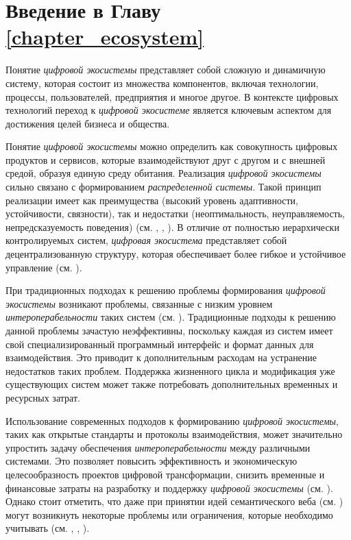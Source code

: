 \section*{Введение в Главу \ref{chapter_ecosystem}}

Понятие \textit{цифровой экосистемы} представляет собой сложную и динамичную систему, которая состоит из множества компонентов, включая технологии, процессы, пользователей, предприятия и многое другое. В контексте цифровых технологий переход к \textit{цифровой экосистеме} является ключевым аспектом для достижения целей бизнеса и общества.

Понятие \textit{цифровой экосистемы} можно определить как совокупность цифровых продуктов и сервисов, которые взаимодействуют друг с другом и с внешней средой, образуя единую среду обитания. Реализация \textit{цифровой экосистемы} сильно связано с формированием \textit{распределенной системы}. Такой принцип реализации имеет как преимущества (высокий уровень адаптивности, устойчивости, связности), так и недостатки (неоптимальность, неуправляемость, непредсказуемость поведения) (см. , , ). В отличие от полностью иерархически контролируемых систем, \textit{цифровая экосистема} представляет собой децентрализованную структуру, которая обеспечивает более гибкое и устойчивое управление (см. ).

При традиционных подходах к решению проблемы формирования \textit{цифровой экосистемы} возникают проблемы, связанные с низким уровнем \textit{интероперабельности} таких систем (см. ). Традиционные подходы к решению данной проблемы зачастую неэффективны, поскольку каждая из систем имеет свой специализированный программный интерфейс и формат данных для взаимодействия. Это приводит к дополнительным расходам на устранение недостатков таких проблем. Поддержка жизненного цикла и модификация уже существующих систем может также потребовать дополнительных временных и ресурсных затрат.

Использование современных подходов к формированию \textit{цифровой экосистемы}, таких как открытые стандарты и протоколы взаимодействия, может значительно упростить задачу обеспечения \textit{интероперабельности} между различными системами. Это позволяет повысить эффективность и экономическую целесообразность проектов цифровой трансформации, снизить временные и финансовые затраты на разработку и поддержку \textit{цифровой экосистемы} (см. ). Однако стоит отметить, что даже при принятии идей семантического веба (см. ) могут возникнуть некоторые проблемы или ограничения, которые необходимо учитывать (см. , , ).

